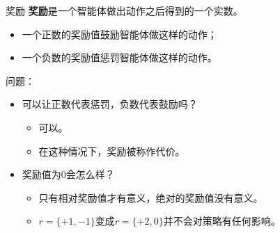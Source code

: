 \documentclass[aspectratio=169,xcolor=dvipsnames]{beamer}
\begin{document}
\begin{frame}{奖励}
    \textbf{奖励}是一个智能体做出动作之后得到的一个实数。
    \begin{itemize}
        \item 一个\alert{正数}的奖励值鼓励智能体做这样的动作；
        \item 一个\alert{负数}的奖励值惩罚智能体做这样的动作。
    \end{itemize}
    问题：
    \begin{itemize}
        \item 可以让正数代表惩罚，负数代表鼓励吗？
        \begin{itemize}
            \item 可以。
            \item 在这种情况下，奖励被称作\alert{代价}。
        \end{itemize}
        \item 奖励值为0会怎么样？
        \begin{itemize}
            \item 只有相对奖励值才有意义，绝对的奖励值没有意义。
            \item $r=\{+1,-1\}$变成$r=\{+2,0\}$并不会对策略有任何影响。
        \end{itemize}
    \end{itemize}
\end{frame}
\end{document}
